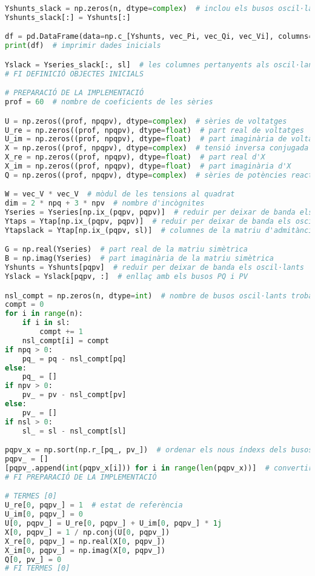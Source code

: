 \begin{lstlisting}[language=Python,numbers=none]
Yshunts_slack = np.zeros(n, dtype=complex)  # inclou els busos oscil·lants, no es redueix
Yshunts_slack[:] = Yshunts[:]

df = pd.DataFrame(data=np.c_[Yshunts, vec_Pi, vec_Qi, vec_Vi], columns=['Ysh', 'P0', 'Q0', 'V0'])
print(df)  # imprimir dades inicials

Yslack = Yseries_slack[:, sl]  # les columnes pertanyents als oscil·lants
# FI DEFINICIÓ OBJECTES INICIALS

# PREPARACIÓ DE LA IMPLEMENTACIÓ
prof = 60  # nombre de coeficients de les sèries

U = np.zeros((prof, npqpv), dtype=complex)  # sèries de voltatges
U_re = np.zeros((prof, npqpv), dtype=float)  # part real de voltatges
U_im = np.zeros((prof, npqpv), dtype=float)  # part imaginària de voltatges
X = np.zeros((prof, npqpv), dtype=complex)  # tensió inversa conjugada
X_re = np.zeros((prof, npqpv), dtype=float)  # part real d'X
X_im = np.zeros((prof, npqpv), dtype=float)  # part imaginària d'X
Q = np.zeros((prof, npqpv), dtype=complex)  # sèries de potències reactives

W = vec_V * vec_V  # mòdul de les tensions al quadrat
dim = 2 * npq + 3 * npv  # nombre d'incògnites
Yseries = Yseries[np.ix_(pqpv, pqpv)]  # reduir per deixar de banda els oscil·lants
Ytaps = Ytap[np.ix_(pqpv, pqpv)]  # reduir per deixar de banda els oscil·lants
Ytapslack = Ytap[np.ix_(pqpv, sl)]  # columnes de la matriu d'admitàncies asimètrica per als oscil·lants

G = np.real(Yseries)  # part real de la matriu simètrica
B = np.imag(Yseries)  # part imaginària de la matriu simètrica
Yshunts = Yshunts[pqpv]  # reduir per deixar de banda els oscil·lants
Yslack = Yslack[pqpv, :]  # enllaç amb els busos PQ i PV

nsl_compt = np.zeros(n, dtype=int)  # nombre de busos oscil·lants trobats abans d'un bus
compt = 0
for i in range(n):
    if i in sl:
        compt += 1
    nsl_compt[i] = compt
if npq > 0:
    pq_ = pq - nsl_compt[pq]
else:
    pq_ = []
if npv > 0:
    pv_ = pv - nsl_compt[pv]
else:
    pv_ = []
if nsl > 0:
    sl_ = sl - nsl_compt[sl]

pqpv_x = np.sort(np.r_[pq_, pv_])  # ordenar els nous índexs dels busos PQ i PV
pqpv_ = []
[pqpv_.append(int(pqpv_x[i])) for i in range(len(pqpv_x))]  # convertir els índexs a enters
# FI PREPARACIÓ DE LA IMPLEMENTACIÓ

# TERMES [0]
U_re[0, pqpv_] = 1  # estat de referència
U_im[0, pqpv_] = 0
U[0, pqpv_] = U_re[0, pqpv_] + U_im[0, pqpv_] * 1j
X[0, pqpv_] = 1 / np.conj(U[0, pqpv_])
X_re[0, pqpv_] = np.real(X[0, pqpv_])
X_im[0, pqpv_] = np.imag(X[0, pqpv_])
Q[0, pv_] = 0
# FI TERMES [0]


\end{lstlisting}
